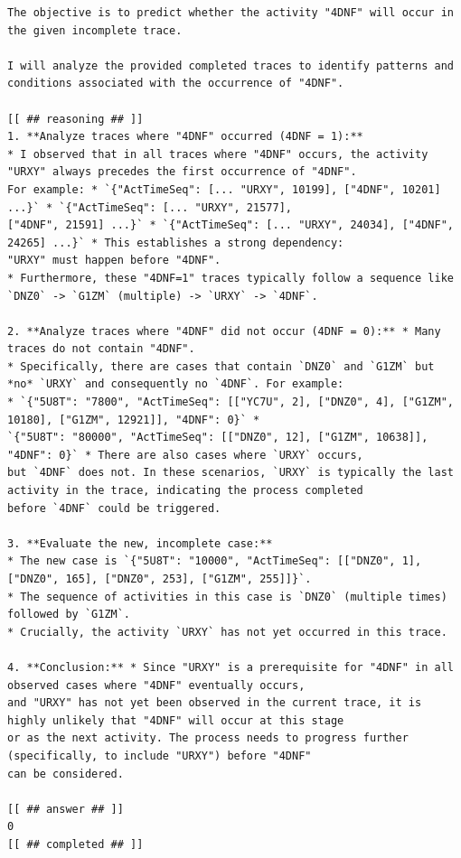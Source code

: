 \begin{lstlisting}
The objective is to predict whether the activity "4DNF" will occur in the given incomplete trace. 

I will analyze the provided completed traces to identify patterns and conditions associated with the occurrence of "4DNF". 

[[ ## reasoning ## ]]
1. **Analyze traces where "4DNF" occurred (4DNF = 1):** 
* I observed that in all traces where "4DNF" occurs, the activity "URXY" always precedes the first occurrence of "4DNF". 
For example: * `{"ActTimeSeq": [... "URXY", 10199], ["4DNF", 10201] ...}` * `{"ActTimeSeq": [... "URXY", 21577], 
["4DNF", 21591] ...}` * `{"ActTimeSeq": [... "URXY", 24034], ["4DNF", 24265] ...}` * This establishes a strong dependency: 
"URXY" must happen before "4DNF". 
* Furthermore, these "4DNF=1" traces typically follow a sequence like `DNZ0` -> `G1ZM` (multiple) -> `URXY` -> `4DNF`. 

2. **Analyze traces where "4DNF" did not occur (4DNF = 0):** * Many traces do not contain "4DNF". 
* Specifically, there are cases that contain `DNZ0` and `G1ZM` but *no* `URXY` and consequently no `4DNF`. For example: 
* `{"5U8T": "7800", "ActTimeSeq": [["YC7U", 2], ["DNZ0", 4], ["G1ZM", 10180], ["G1ZM", 12921]], "4DNF": 0}` * 
`{"5U8T": "80000", "ActTimeSeq": [["DNZ0", 12], ["G1ZM", 10638]], "4DNF": 0}` * There are also cases where `URXY` occurs, 
but `4DNF` does not. In these scenarios, `URXY` is typically the last activity in the trace, indicating the process completed 
before `4DNF` could be triggered. 

3. **Evaluate the new, incomplete case:** 
* The new case is `{"5U8T": "10000", "ActTimeSeq": [["DNZ0", 1], ["DNZ0", 165], ["DNZ0", 253], ["G1ZM", 255]]}`. 
* The sequence of activities in this case is `DNZ0` (multiple times) followed by `G1ZM`. 
* Crucially, the activity `URXY` has not yet occurred in this trace. 

4. **Conclusion:** * Since "URXY" is a prerequisite for "4DNF" in all observed cases where "4DNF" eventually occurs, 
and "URXY" has not yet been observed in the current trace, it is highly unlikely that "4DNF" will occur at this stage
or as the next activity. The process needs to progress further (specifically, to include "URXY") before "4DNF" 
can be considered.

[[ ## answer ## ]]
0
[[ ## completed ## ]]


\end{lstlisting}







